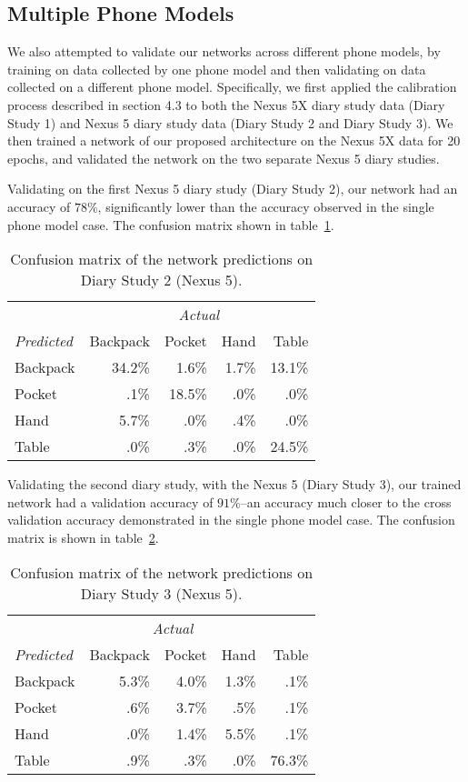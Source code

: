 \subsection{Multiple Phone Models}
We also attempted to validate our networks across different phone models, by training
on data collected by one phone model and then validating on data collected on a 
different phone model. Specifically, we first applied the calibration process described in section 4.3 
to both the Nexus 5X diary study data (Diary Study 1) and Nexus 5 diary study data (Diary Study 2 and Diary Study 3).
We then trained a network of our proposed architecture on the Nexus 5X data for 20 epochs, 
and validated the network on the two separate Nexus 5 diary studies.

Validating on the first Nexus 5 diary study (Diary Study 2), our network
had an accuracy of $78\%$, significantly lower than the accuracy observed
in the single phone model case. The  confusion matrix shown in table~\ref{fig:confusion2}.

\begin{table}[h]
\caption{Confusion matrix of the network predictions on Diary Study 2 (Nexus 5).}\label{fig:confusion2}
\centering
\begin{tabular}{ l rrrr }  
\toprule
   & \multicolumn{4}{c}{\textit{Actual}} \\
\cmidrule{2-5}
\textit{Predicted}	&	Backpack    & 	Pocket 	& 	Hand	&	Table \\
\midrule
Backpack			&	34.2\% 	&	1.6\%	&	1.7\% 	&	13.1\% \\
Pocket			&	.1\% 		&	18.5\% 	&	.0\%		&	.0\% \\
Hand			&	5.7\%	&	.0\%	 	&	.4\% 		&	.0\% \\
Table			&	.0\% 		&	.3\% 		&	.0\%	 	&	24.5\%\\
\bottomrule
\end{tabular}
\end{table}

Validating the second diary study, with the Nexus 5 (Diary Study 3), our trained network had a validation
accuracy of $91\%$--an accuracy much closer to the cross validation accuracy
demonstrated in the single phone model case. The  confusion matrix is 
shown in table~\ref{fig:confusion3}.

\begin{table}[h]
\caption{Confusion matrix of the network predictions on Diary Study 3 (Nexus 5).}\label{fig:confusion3} \centering
\begin{tabular}{ l rrrr }  
\toprule
 & \multicolumn{3}{c}{\textit{Actual}} \\ 
\cmidrule{2-5}
\textit{Predicted}	&	Backpack    & 	Pocket 	& 	Hand	&	Table \\
\midrule
Backpack			&	5.3\% 	&	4.0\%	&	1.3\% 	&	.1\% \\
Pocket			&	  .6\% 	&	3.7\% 	&	.5\% 		&	.1\% \\
Hand			&	 .0\% 	&	1.4\% 	&	5.5\% 	&	.1\% \\
Table			&	 .9\% 	&	 .3\% 	&	.0\%		&	76.3\%\\
\bottomrule
\end{tabular}
\end{table}



